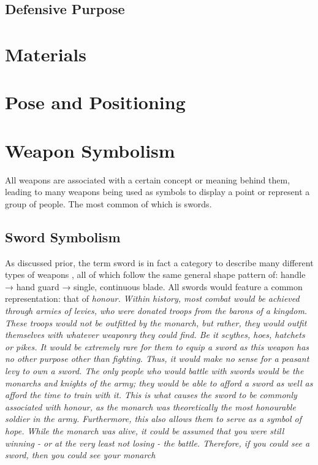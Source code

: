 \documentclass{article}
\begin{document}
\subsection{Defensive Purpose}

\pagebreak

\section{Materials}

\pagebreak
\section{Pose and Positioning}



\pagebreak

\section{Weapon Symbolism}
All weapons are associated with a certain concept or meaning behind them, leading to many weapons being used as symbols to display a point or represent a group of people. The most common of which is swords.
\subsection{Sword Symbolism}
As discussed prior, the term sword is in fact a category to describe many different types of weapons \parencite{furat1998brief}, all of which follow the same general shape pattern of: handle → hand guard → single, continuous blade.
All swords would feature a common representation: that of \em{honour}. Within history, most combat would be achieved through armies of \em{levies}, who were donated troops from the \em{barons} of a \em{kingdom}. These troops would not be outfitted by the monarch, but rather, they would outfit themselves with whatever weaponry they could find. Be it scythes, hoes, hatchets or pikes. It would be extremely rare for them to equip a sword as this weapon has no other purpose other than fighting. Thus, it would make no sense for a peasant levy to own a sword. The only people who \em{would} battle with swords would be the monarchs and knights of the army; they would be able to afford a sword as well as afford the time to train with it. This is what causes the sword to be commonly associated with honour, as the monarch was \textit{theoretically} the most honourable soldier in the army. Furthermore, this also allows them to serve as a symbol of hope. While the monarch was alive, it could be assumed that you were still winning - or at the very least \em{not losing} - the battle. Therefore, if you could see a sword, then you could see your monarch
\end{document}
